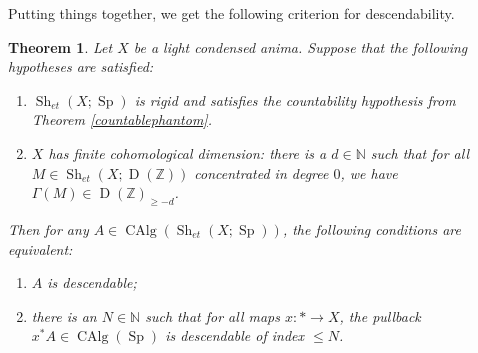\documentclass[12pt]{article}
\newtheorem{theorem}{Theorem}[section]
\newcommand{\on}{\operatorname}
\begin{document}
Putting things together, we get the following criterion for descendability.

\begin{theorem}\label{descendabletheorem}
Let $X$ be a light condensed anima.  Suppose that the following hypotheses are satisfied:
\begin{enumerate}
\item $\on{Sh}_{et}(X;\on{Sp})$ is rigid and satisfies the countability hypothesis from Theorem \ref{countablephantom}.
\item $X$ has finite cohomological dimension: there is a $d\in\mathbb{N}$ such that for all $M\in \on{Sh}_{et}(X;\on{D}(\mathbb{Z}))$ concentrated in degree $0$, we have $\Gamma(M)\in\on{D}(\mathbb{Z})_{\geq -d}$.
\end{enumerate}
Then for any $A\in \on{CAlg}(\on{Sh}_{et}(X;\on{Sp}))$, the following conditions are equivalent:
\begin{enumerate}
\item $A$ is descendable;
\item there is an $N\in\mathbb{N}$ such that for all maps $x:\ast\to X$, the pullback $x^\ast A \in \on{CAlg}(\on{Sp})$ is descendable of index $\leq N$.
\end{enumerate}
\end{theorem}
\end{document}
